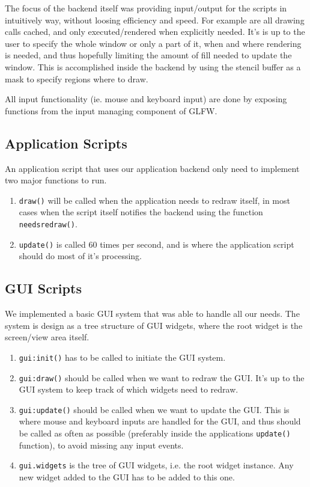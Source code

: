 The focus of the backend itself was providing input/output for the scripts in intuitively way, without loosing efficiency and speed. For example are all drawing calls cached, and only executed/rendered when explicitly needed. It's is up to the user to specify the whole window or only a part of it, when and where rendering is needed, and thus hopefully limiting the amount of fill needed to update the window. This is accomplished inside the backend by using the stencil buffer as a mask to specify regions where to draw.

All input functionality (ie. mouse and keyboard input) are done by exposing functions from the input managing component of GLFW.

\subsection{Application Scripts}
An application script that uses our application backend only need to implement two major functions to run.
\begin{enumerate}
  \item \texttt{draw()} will be called when the application needs to redraw itself, in most cases when the script itself notifies the backend using the function \texttt{needsredraw()}.
  \item \texttt{update()} is called 60 times per second, and is where the application script should do most of it's processing.
\end{enumerate}

\subsection{GUI Scripts}
We implemented a basic GUI system that was able to handle all our needs. The system is design as a tree structure of GUI widgets, where the root widget is the screen/view area itself.
\begin{enumerate}
  \item \texttt{gui:init()} has to be called to initiate the GUI system.
  \item \texttt{gui:draw()} should be called when we want to redraw the GUI. It's up to the GUI system to keep track of which widgets need to redraw.
  \item \texttt{gui:update()} should be called when we want to update the GUI. This is where mouse and keyboard inputs are handled for the GUI, and thus should be called as often as possible (preferably inside the applications \texttt{update()} function), to avoid missing any input events.
  \item \texttt{gui.widgets} is the tree of GUI widgets, i.e. the root widget instance. Any new widget added to the GUI has to be added to this one.
\end{enumerate}

